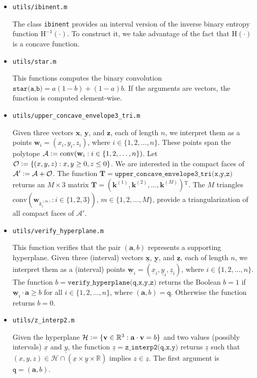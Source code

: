 \documentclass[a4paper,12pt]{scrartcl}
\newcommand{\cvx}[1]{\ensuremath{\mathrm{conv}(#1)}}
\newcommand{\ul}[1]{\ensuremath{\underline{#1}}}
\newcommand{\mat}[1]{\ensuremath{\mathbf{#1}}}
\newcommand{\vt}[1]{\ensuremath{\mathbf{#1}}}
\newcommand{\transp}{\ensuremath{^{\mathrm T}}}
\newcommand{\AAA}{\ensuremath{\mathcal A}}
\newcommand{\HHH}{\ensuremath{\mathcal H}}
\newcommand{\OOO}{\ensuremath{\mathcal O}}
\newcommand{\RR}{\ensuremath{\mathbb R}}
\newcommand{\defas}{\vcentcolon=}
\newcommand{\binEnt}[1]{\ensuremath{\mathrm{H}(#1)}}
\newcommand{\binEntInv}[1]{\ensuremath{\mathrm{H}^{-1}(#1)}}
\newcommand{\Nto}[1]{\ensuremath{\{1,2,\dots,#1\}}}
\begin{document}
\begin{itemize}
  
\item \texttt{utils/ibinent.m}

  The class \texttt{ibinent} provides an interval version of the inverse binary entropy function $\binEntInv{\cdot}$. To construct it, we take advantage of the fact that $\binEnt{\cdot}$ is a concave function.
  
  

  
\item \texttt{utils/star.m}

  This functions computes the binary convolution $\texttt{star(a,b)} = a (1-b) + (1-a) b$. If the arguments are vectors, the function is computed element-wise.
  
  
  
\item \texttt{utils/upper\_concave\_envelope3\_tri.m}

  Given three vectors $\vt x$, $\vt y$, and $\vt z$, each of length $n$, we interpret them as a points $\vt w_i = (x_i, y_i, z_i)$, where $i \in \Nto{n}$.
  These points span the polytope $\AAA \defas \cvx{\vt w_i : i \in \Nto{n}}$. Let $\OOO \defas \{(x,y,z) : x,y \ge 0, z \le 0 \}$. We are interested in the compact faces of $\AAA' \defas \AAA + \OOO$. The function $\mat T = \texttt{upper\_concave\_envelope3\_tri(x,y,z)}$ returns an $M \times 3$ matrix $\mat T = (\vt k^{(1)}, \vt k^{(2)}, \dots ,\vt k^{(M)})\transp$. The $M$ triangles $\cvx{\vt w_{k^{(m)}_i} : i \in \{1,2,3\}}$, $m \in \Nto{M}$, provide a triangularization of all compact faces of $\AAA'$.
  
  
  
\item \texttt{utils/verify\_hyperplane.m}

  This function verifies that the pair $(\vt a, b)$ represents a supporting hyperplane. Given three (interval) vectors $\ul{\vt x}$, $\ul{\vt y}$, and $\ul{\vt z}$, each of length $n$, we interpret them as a (interval) points $\ul{\vt w}_i = (\ul x_i, \ul y_i, \ul z_i)$, where $i \in \Nto{n}$. The function $b=\texttt{verify\_hyperplane(q,x,y,z)}$ returns the Boolean $b = 1$ if $\ul{\vt w}_i \cdot \vt a \ge b$ for all $i \in \Nto{n}$, where $(\vt a, b) = \texttt{q}$. Otherwise the function returns $b = 0$.

  
\item \texttt{utils/z\_interp2.m}

  Given the hyperplane $\HHH \defas \{\vt v \in \RR^3: \vt a \cdot \vt v = b\}$ and two values (possibly intervals) $\ul x$ and $\ul y$, the function $\ul z =  \texttt{z\_interp2(q,x,y)}$ returns $\ul z$ such that $(x,y,z) \in \HHH \cap ( \ul x \times \ul y \times \RR )$ implies $z \in \ul z$. The first argument is $\texttt{q} = (\vt a, b)$.
  
  
\end{itemize}
 


\printbibliography[heading=bibintoc]
\end{document}

